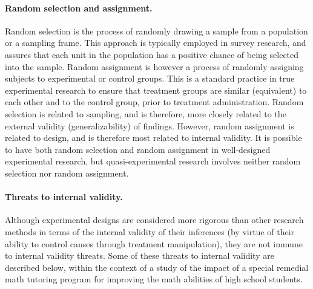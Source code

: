 \paragraph{Random selection and assignment.} Random selection is the process of randomly drawing a sample from a population or a sampling frame. This approach is typically employed in survey research, and assures that each unit in the population has a positive chance of being selected into the sample. Random assignment is however a process of randomly assigning subjects to experimental or control groups. This is a standard practice in true experimental research to ensure that treatment groups are similar (equivalent) to each other and to the control group, prior to treatment administration. Random selection is related to sampling, and is therefore, more closely related to the external validity (generalizability) of findings. However, random assignment is related to design, and is therefore most related to internal validity. It is possible to have both random selection and random assignment in well-designed experimental research, but quasi-experimental research involves neither random selection nor random assignment.

\paragraph{Threats to internal validity.} Although experimental designs are considered more rigorous than other research methods in terms of the internal validity of their inferences (by virtue of their ability to control causes through treatment manipulation), they are not immune to internal validity threats. Some of these threats to internal validity are described below, within the context of a study of the impact of a special remedial math tutoring program for improving the math abilities of high school students.

